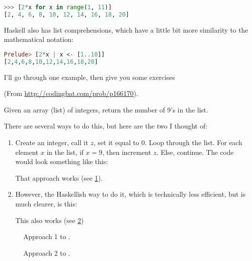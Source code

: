 \begin{lstlisting}[language=Python]
>>> [2*x for x in range(1, 11)]
[2, 4, 6, 8, 10, 12, 14, 16, 18, 20]
\end{lstlisting}

Haskell also has list comprehensions, which have a little bit more
similarity to the mathematical notation:

\begin{lstlisting}[language=Haskell]
Prelude> [2*x | x <- [1..10]]
[2,4,6,8,10,12,14,16,18,20]
\end{lstlisting}

I'll go through one example, then give you some exercises

\begin{example}
  (From \url{http://codingbat.com/prob/p166170}).

  Given an array (list) of integers, return the number of 9's in the
  list.

  \begin{solution}
    There are several ways to do this, but here are the two I thought
    of:

    \begin{enumerate}
    \item Create an integer, call it $z$, set it equal to $0$. Loop
      through the list. For each element $x$ in the list, if $x = 9$,
      then increment $z$. Else, continue. The code would look
      something like this:


      That approach works (see \cref{fig:array_count9-1}).

    \item However, the Haskellish way to do it, which is technically
      less efficient, but is much clearer, is this:


      This also works (see \cref{fig:array_count9-2})
    \end{enumerate}
  \end{solution}
\end{example}

\begin{figure}[h]
  \centering
  \caption{Approach 1 to .}
  \label{fig:array_count9-1}
\end{figure}

\begin{figure}[h]
  \centering
  \caption{Approach 2 to .}
  \label{fig:array_count9-2}
\end{figure}


